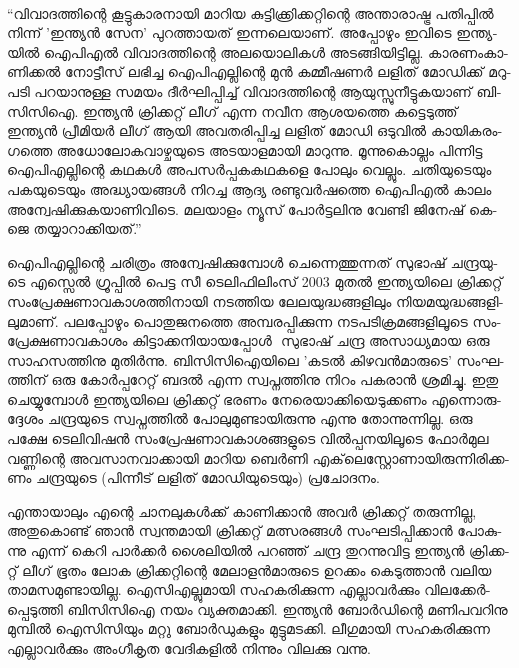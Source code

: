 \vskip 2pt

‌\begin{framed}
­``വി­വാ­ദ­ത്തി­ന്റെ കൂ­ട്ടു­കാ­ര­നാ­യി മാ­റിയ കു­ട്ടി­ക്ക്രി­ക്ക­റ്റി­ന്റെ അന്താ­രാ­ഷ്ട്ര പതി­പ്പില്‍ നി­ന്ന് 'ഇ­ന്ത്യന്‍ സേ­ന' പു­റ­ത്താ­യ­ത് 
ഇന്ന­ലെ­യാ­ണ്. അപ്പോ­ഴും ഇവി­ടെ ഇന്ത്യ­യില്‍ ഐ­പി­എല്‍ വി­വാ­ദ­ത്തി­ന്റെ അല­യൊ­ലി­കള്‍ അട­ങ്ങി­യി­ട്ടി­ല്ല. 
കാ­ര­ണം­കാ­ണി­ക്കല്‍ നോ­ട്ടീ­സ് ലഭി­ച്ച ഐപി­എ­ല്ലി­ന്റെ മുന്‍ കമ്മീ­ഷ­ണര്‍ ലളി­ത് മോ­ഡി­ക്ക് മറു­പ­ടി പറ­യാ­നു­ള്ള 
സമ­യം ദീര്‍­ഘി­പ്പി­ച്ച് വി­വാ­ദ­ത്തി­ന്റെ ആയു­സ്സു­നീ­ട്ടു­ക­യാ­ണ് ബി­സി­സി­ഐ. ഇന്ത്യന്‍ ­ക്രി­ക്ക­റ്റ് ലീ­ഗ് എന്ന നവീന 
ആശ­യ­ത്തെ കട്ടെ­ടു­ത്ത് ഇന്ത്യന്‍ പ്രീ­മി­യര്‍ ലീ­ഗ് ആയി അവ­ത­രി­പ്പി­ച്ച ­ല­ളി­ത് മോ­ഡി­ ഒടു­വില്‍ കാ­യി­ക­രം­ഗ­ത്തെ 
അധോ­ലോ­ക­വാ­ഴ്ച­യു­ടെ അട­യാ­ള­മാ­യി മാ­റു­ന്നു. മൂ­ന്നു­കൊ­ല്ലം പി­ന്നി­ട്ട ഐപി­എ­ല്ലി­ന്റെ കഥ­കള്‍ അപ­സര്‍­പ്പ­ക­ക­ഥ­ക­ളെ 
പോ­ലും വെ­ല്ലും. ചതി­യു­ടെ­യും പക­യു­ടെ­യും അദ്ധ്യാ­യ­ങ്ങള്‍ നി­റ­ച്ച ആദ്യ രണ്ടു­വര്‍­ഷ­ത്തെ ഐപി­എല്‍ കാ­ലം 
അന്വേ­ഷി­ക്കു­ക­യാ­ണി­വി­ടെ­.  മല­യാ­ളം ന്യൂ­സ് പോര്‍­ട്ട­ലി­നു വേ­ണ്ടി ജി­നേ­ഷ് കെ­ജെ തയ്യാ­റാ­ക്കി­യ­ത്.''
\end{framed}

{\vskip 12pt}

ഐ­പി­എ­ല്ലി­ന്റെ ചരി­ത്രം അന്വേ­ഷി­ക്കു­മ്പോള്‍ ചെ­ന്നെ­ത്തു­ന്ന­ത് സു­ഭാ­ഷ് ചന്ദ്ര­യു­ടെ എസ്സെല്‍ ഗ്രൂ­പ്പില്‍ പെ­ട്ട സീ ടെ­ലി­ഫി­ലിം­സ് 
2003 മു­തല്‍ ഇന്ത്യ­യി­ലെ ക്രി­ക്ക­റ്റ് സം­പ്രേ­ക്ഷ­ണാ­വ­കാ­ശ­ത്തി­നാ­യി നട­ത്തിയ ലേ­ല­യു­ദ്ധ­ങ്ങ­ളി­ലും നി­യ­മ­യു­ദ്ധ­ങ്ങ­ളി­ലു­മാ­ണ്. 
പല­പ്പോ­ഴും പൊ­തു­ജ­ന­ത്തെ അമ്പ­ര­പ്പി­ക്കു­ന്ന നട­പ­ടി­ക്ര­മ­ങ്ങ­ളി­ലൂ­ടെ സം­പ്രേ­ക്ഷ­ണാ­വ­കാ­ശം കി­ട്ടാ­ക്ക­നി­യാ­യ­പ്പോള്‍ ­
സു­ഭാ­ഷ് ചന്ദ്ര അസാ­ധ്യ­മായ ഒരു സാ­ഹ­സ­ത്തി­നു മു­തിര്‍­ന്നു. ബി­സി­സി­ഐ­യി­ലെ 'ക­ടല്‍ കി­ഴ­വന്‍­മാ­രു­ടെ' സം­ഘ­ത്തി­ന് 
ഒരു കോര്‍­പ്പ­റേ­റ്റ് ബദല്‍ എന്ന സ്വ­പ്ന­ത്തി­നു നി­റം പക­രാന്‍ ശ്ര­മി­ച്ചു. ഇതു ചെ­യ്യു­മ്പോള്‍ ഇന്ത്യ­യി­ലെ ക്രി­ക്ക­റ്റ് ഭര­ണം 
നേ­രെ­യാ­ക്കി­യെ­ടു­ക്ക­ണം എന്നൊ­രു­ദ്ദേ­ശം ചന്ദ്ര­യു­ടെ സ്വ­പ്ന­ത്തില്‍ പോ­ലു­മു­ണ്ടാ­യി­രു­ന്നു എന്നു തോ­ന്നു­ന്നി­ല്ല. ഒരു പക്ഷേ 
ടെ­ലി­വി­ഷന്‍ സം­പ്രേ­ഷ­ണാ­വ­കാ­ശ­ങ്ങ­ളു­ടെ വില്‍­പ്പ­ന­യി­ലൂ­ടെ ഫോര്‍­മുല വണ്ണി­ന്റെ അവ­സാ­ന­വാ­ക്കാ­യി മാ­റിയ ബെര്‍­ണി 
എക്‌­ലെ­സ്റ്റോ­ണാ­യി­രു­ന്നി­രി­ക്ക­ണം ചന്ദ്ര­യു­ടെ (പി­ന്നീ­ട് ലളി­ത് മോ­ഡി­യു­ടെ­യും) പ്ര­ചോ­ദ­നം­.

എ­ന്താ­യാ­ലും എന്റെ ചാ­ന­ലു­കള്‍­ക്ക് കാ­ണി­ക്കാന്‍ അവര്‍ ക്രി­ക്ക­റ്റ് തരു­ന്നി­ല്ല, അതു­കൊ­ണ്ട് ഞാന്‍ സ്വ­ന്ത­മാ­യി 
ക്രി­ക്ക­റ്റ് മത്സ­ര­ങ്ങള്‍ സം­ഘ­ടി­പ്പി­ക്കാന്‍ പോ­കു­ന്നു എന്ന് ­കെ­റി പാര്‍­ക്കര്‍ ശൈ­ലി­യില്‍ പറ­ഞ്ഞ് ചന്ദ്ര തു­റ­ന്നു­വി­ട്ട ഇന്ത്യന്‍ 
ക്രി­ക്ക­റ്റ് ലീ­ഗ് ഭൂ­തം ലോക ക്രി­ക്ക­റ്റി­ന്റെ മേ­ലാ­ളന്‍­മാ­രു­ടെ ഉറ­ക്കം കെ­ടു­ത്താന്‍ വലിയ താ­മ­സ­മു­ണ്ടാ­യി­ല്ല. ഐസി­എ­ല്ലു­മാ­യി 
സഹ­ക­രി­ക്കു­ന്ന എല്ലാ­വര്‍­ക്കും വി­ല­ക്കേര്‍­പ്പെ­ടു­ത്തി ­ബി­സി­സി­ഐ­ നയം വ്യ­ക്ത­മാ­ക്കി. ഇന്ത്യന്‍ ബോര്‍­ഡി­ന്റെ മണി­പ­വ­റി­നു 
മു­മ്പില്‍ ഐസി­സി­യും മറ്റു ബോര്‍­ഡു­ക­ളും മു­ട്ടു­മ­ട­ക്കി. ലീ­ഗു­മാ­യി സഹ­ക­രി­ക്കു­ന്ന എല്ലാ­വര്‍­ക്കും അം­ഗീ­കൃത വേ­ദി­ക­ളില്‍ നി­ന്നും 
വി­ല­ക്കു വന്നു.

